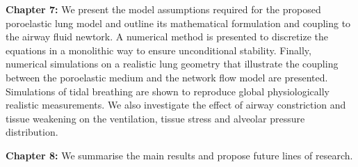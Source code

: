 \noindent \textbf{Chapter 7:} We present the model assumptions required for the proposed poroelastic lung model and outline its mathematical formulation and coupling to the airway fluid newtork. A numerical method is presented to discretize the equations in a monolithic way to ensure unconditional stability. Finally, numerical simulations on a realistic lung geometry that illustrate the coupling between the poroelastic medium and the network flow model are presented. Simulations of tidal breathing are shown to reproduce global physiologically realistic measurements. We also investigate the effect of airway constriction and tissue weakening on the ventilation, tissue stress and alveolar pressure distribution.
\newline

\noindent \textbf{Chapter 8:} We summarise the main results and propose future lines of research.
\newline



 
 


